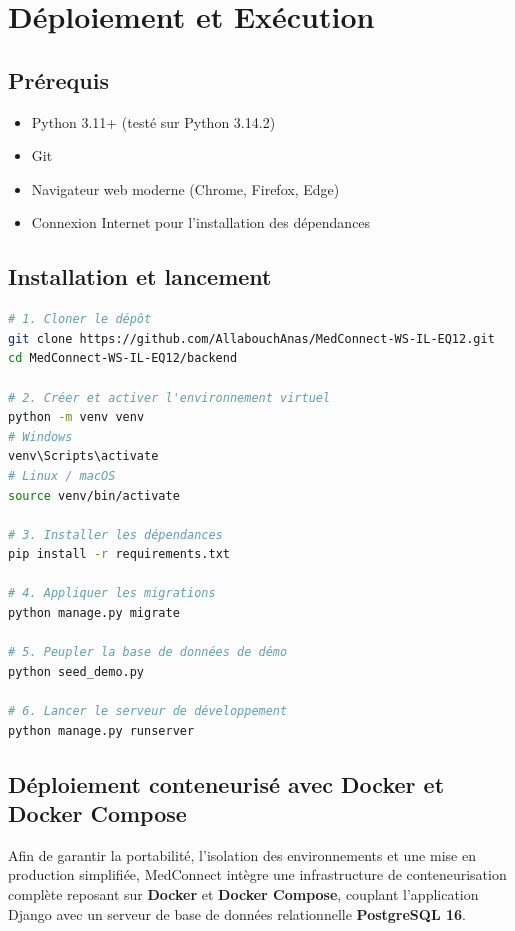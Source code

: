 \documentclass[12pt,a4paper]{report}
\begin{document}
\chapter{Déploiement et Exécution}

\section{Prérequis}

\begin{itemize}[leftmargin=*]
  \item Python 3.11+ (testé sur Python 3.14.2)
  \item Git
  \item Navigateur web moderne (Chrome, Firefox, Edge)
  \item Connexion Internet pour l'installation des dépendances
\end{itemize}

\section{Installation et lancement}

\begin{lstlisting}[language=bash, caption={Procédure d'installation complète}]
# 1. Cloner le dépôt
git clone https://github.com/AllabouchAnas/MedConnect-WS-IL-EQ12.git
cd MedConnect-WS-IL-EQ12/backend

# 2. Créer et activer l'environnement virtuel
python -m venv venv
# Windows
venv\Scripts\activate
# Linux / macOS
source venv/bin/activate

# 3. Installer les dépendances
pip install -r requirements.txt

# 4. Appliquer les migrations
python manage.py migrate

# 5. Peupler la base de données de démo
python seed_demo.py

# 6. Lancer le serveur de développement
python manage.py runserver
\end{lstlisting}

\section{Déploiement conteneurisé avec Docker et Docker Compose}

Afin de garantir la portabilité, l'isolation des environnements et une mise en production simplifiée, MedConnect intègre une infrastructure de conteneurisation complète reposant sur \textbf{Docker} et \textbf{Docker Compose}, couplant l'application Django avec un serveur de base de données relationnelle \textbf{PostgreSQL 16}.
\end{document}

